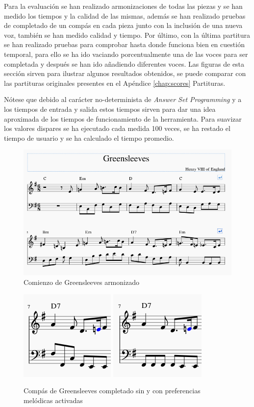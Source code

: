  Para la evaluación se han realizado armonizaciones de todas las piezas y se han medido los tiempos y la calidad de las mismas, además se han realizado pruebas de completado de un compás en cada pieza junto con la inclusión de una nueva voz, también se han medido calidad y tiempo. Por último, con la última partitura se han realizado pruebas para comprobar hasta donde funciona bien en cuestión temporal, para ello se ha ido vaciando porcentualmente una de las voces para ser completada y después se han ido añadiendo diferentes voces. Las figuras de esta sección sirven para ilustrar algunos resultados obtenidos, se puede comparar con las partituras originales presentes en el Apéndice \ref{chap:scores} Partituras.
 
 Nótese que debido al carácter no-determinista de \textit{Answer Set Programming} y a los tiempos de entrada y salida estos tiempos sirven para dar una idea aproximada de los tiempos de funcionamiento de la herramienta. Para suavizar los valores dispares se ha ejecutado cada medida 100 veces, se ha restado el tiempo de usuario y se ha calculado el tiempo promedio. 


\begin{figure}
	\centering
	\includegraphics[width=0.8\linewidth]{imagenes/evaluation/greensleeves_harm.png}
	\caption{Comienzo de Greensleeves armonizado}
	\label{fig:greensleeves_harm}
\end{figure}

\begin{figure}
   	\centering
   	\includegraphics[width=0.2\linewidth,valign=c]{imagenes/evaluation/greensleeves_measure.png}
   	\includegraphics[width=0.2\linewidth,valign=c]{imagenes/evaluation/greensleeves_measure_melodious.png}
   	\caption{Compás de Greensleeves completado sin y con preferencias melódicas activadas}
   	\label{fig:greensleeves_measure}
\end{figure}



